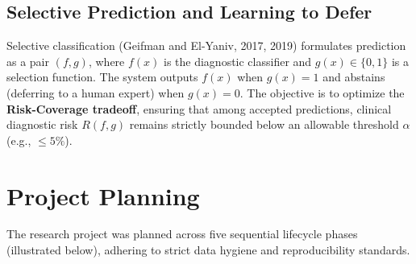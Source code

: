 \documentclass[11pt,a4paper]{article}
\begin{document}
\subsection{Selective Prediction and Learning to Defer}
Selective classification (Geifman and El-Yaniv, 2017, 2019) formulates prediction as a pair $(f, g)$, where $f(x)$ is the diagnostic classifier and $g(x) \in \{0, 1\}$ is a selection function. The system outputs $f(x)$ when $g(x) = 1$ and abstains (deferring to a human expert) when $g(x) = 0$. The objective is to optimize the \textbf{Risk-Coverage tradeoff}, ensuring that among accepted predictions, clinical diagnostic risk $R(f, g)$ remains strictly bounded below an allowable threshold $\alpha$ (e.g., $\le 5\%$).

\section{Project Planning}
The research project was planned across five sequential lifecycle phases (illustrated below), adhering to strict data hygiene and reproducibility standards.
\end{document}
